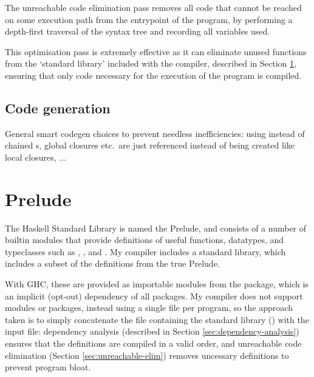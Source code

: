 \documentclass[dissertation.tex]{subfiles}
\begin{document}
{{        The unreachable code elimination pass removes all code that cannot be reached on some execution path from
        the entrypoint of the program, by performing a depth-first traversal of the syntax tree and recording all
        variables used.

        This optimisation pass is extremely effective as it can eliminate unused functions from the `standard
        library' included with the compiler, described in Section \ref{sec:prelude}, ensuring that only code
        necessary for the execution of the program is compiled.

    }
    \subsection{Code generation}
    {

        General smart codegen choices to prevent needless inefficiencies: using  instead of
        chained s, global closures etc.\ are just referenced instead of being created like local
        closures, ...


    }
}
\section{Prelude}\label{sec:prelude}
{

    The Haskell Standard Library is named the Prelude, and consists of a number of builtin modules that provide
    definitions of useful functions, datatypes, and typeclasses such as , , and
    . My compiler includes a standard library, which includes a subset of the definitions from the
    true Prelude.
    
    With GHC, these are provided as importable modules from the  package, which is an implicit
    (opt-out) dependency of all packages. My compiler does not support modules or packages, instead using a single
    file per program, so the approach taken is to simply concatenate the file containing the standard library
    () with the input file: dependency analysis (described in Section
    \ref{sec:dependency-analysis}) ensures that the definitions are compiled in a valid order, and unreachable code
    elimination (Section \ref{sec:unreachable-elim}) removes uncessary definitions to prevent program bloat.

}
\end{document}
